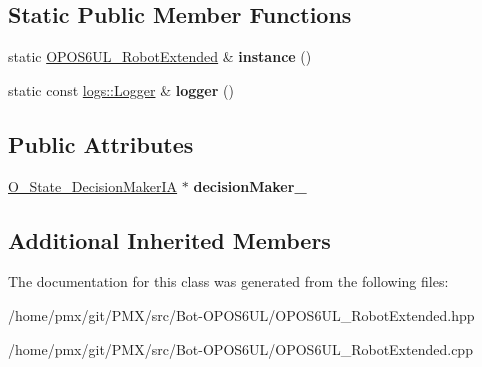 \subsection*{Static Public Member Functions}
\begin{DoxyCompactItemize}
\item 
\mbox{\label{classOPOS6UL__RobotExtended_a514e663cf7537d64d2d0272b8856d6c0}} 
static \hyperlink{classOPOS6UL__RobotExtended}{O\+P\+O\+S6\+U\+L\+\_\+\+Robot\+Extended} \& {\bfseries instance} ()
\item 
\mbox{\label{classOPOS6UL__RobotExtended_a096aea03c751e0cfdc4ce25741fdbe67}} 
static const \hyperlink{classlogs_1_1Logger}{logs\+::\+Logger} \& {\bfseries logger} ()
\end{DoxyCompactItemize}
\subsection*{Public Attributes}
\begin{DoxyCompactItemize}
\item 
\mbox{\label{classOPOS6UL__RobotExtended_ae7e85a7cc8a5002c193e87bcc51dd922}} 
\hyperlink{classO__State__DecisionMakerIA}{O\+\_\+\+State\+\_\+\+Decision\+Maker\+IA} $\ast$ {\bfseries decision\+Maker\+\_\+}
\end{DoxyCompactItemize}
\subsection*{Additional Inherited Members}


The documentation for this class was generated from the following files\+:\begin{DoxyCompactItemize}
\item 
/home/pmx/git/\+P\+M\+X/src/\+Bot-\/\+O\+P\+O\+S6\+U\+L/O\+P\+O\+S6\+U\+L\+\_\+\+Robot\+Extended.\+hpp\item 
/home/pmx/git/\+P\+M\+X/src/\+Bot-\/\+O\+P\+O\+S6\+U\+L/O\+P\+O\+S6\+U\+L\+\_\+\+Robot\+Extended.\+cpp\end{DoxyCompactItemize}
